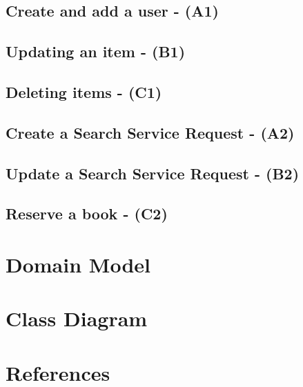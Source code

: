 \documentclass{article}
\begin{document}
\subsection{Create and add a user - (A1)}


\subsection{Updating an item - (B1)}



\subsection{Deleting items - (C1)}


\subsection{Create a Search Service Request - (A2)}


\subsection{Update a Search Service Request - (B2)}


\subsection{Reserve a book - (C2)}


\section{Domain Model}

\section{Class Diagram}
\section{References}
\end{document}
